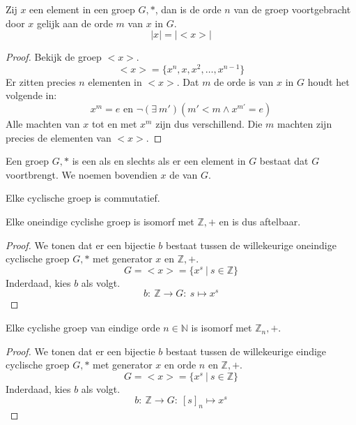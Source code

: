 \documentclass[main.tex]{subfiles}
\begin{document}
\begin{st}
  \label{st:orde-van-generator-is-orde-van-groep}
  Zij $x$ een element in een groep $G,*$, dan is de orde $n$ van de groep voortgebracht door $x$ gelijk aan de orde $m$ van $x$ in $G$.
  \[ |x| = |<x>| \]

  \begin{proof}
    Bekijk de groep $<x>$.
    \[ <x> = \{ x^{n}, x,x^{2},\dotsc,x^{n-1}\} \]
    Er zitten precies $n$ elementen in $<x>$.
    Dat $m$ de orde is van $x$ in $G$ houdt het volgende in:
    \[ x^{m} = e \text{ en } \neg (\exists\ m')(m'<m \wedge x^{m'} = e) \]
    Alle machten van $x$ tot en met $x^{m}$ zijn dus verschillend.
    Die $m$ machten zijn precies de elementen van $<x>$.
  \end{proof}
\end{st}
 
\begin{de}
  \label{de:cyclische-groep}
  Een groep $G,*$ is een  als en slechts als er een element in $G$ bestaat dat $G$ voortbrengt.
  We noemen bovendien $x$ de  van $G$.
\end{de}

\begin{st}
  \label{st:cyclishe-groep-is-commutatief}
  Elke cyclische groep is commutatief.
\end{st}

\begin{ei}
  Elke oneindige cyclishe groep is isomorf met $\mathbb{Z},+$ en is dus aftelbaar.

  \begin{proof}
    We tonen dat er een bijectie $b$ bestaat tussen de willekeurige oneindige cyclische groep $G,*$ met generator $x$ en $\mathbb{Z},+$.
    \[ G = <x> = \{ x^{s}\ |\ s \in \mathbb{Z} \} \]
    Inderdaad, kies $b$ als volgt.
    \[ b:\ \mathbb{Z} \rightarrow G:\ s \mapsto x^{s} \]
  \end{proof}
\end{ei}

\begin{ei}
  Elke cyclishe groep van eindige orde $n \in \mathbb{N}$ is isomorf met $\mathbb{Z}_{n},+$.

  \begin{proof}
    We tonen dat er een bijectie $b$ bestaat tussen de willekeurige eindige cyclische groep $G,*$ met generator $x$ en orde $n$ en $\mathbb{Z},+$.
    \[ G = <x> = \{ x^{s}\ |\ s \in \mathbb{Z} \} \]
    Inderdaad, kies $b$ als volgt.
    \[ b:\ \mathbb{Z} \rightarrow G:\ [s]_{n} \mapsto x^{s} \]
  \end{proof}
\end{ei}
\end{document}
